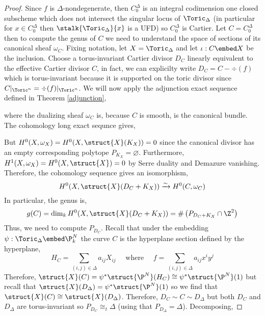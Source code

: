 \documentclass[12pt]{article}
\begin{document}
\begin{proof}
Since $f$ is $\Delta$-nondegenerate, then $C_0^\Delta$ is an integral codimension one closed subscheme which does not intersect the singular locus of $\Toric_\Delta$ (in particular for $x \in C_0^\Delta$ then $\stalk{\Toric_\Delta}{x}$ is a UFD) so $C_0^\Delta$ is Cartier. Let $C = C_0^\Delta$ then to compute the genus of $C$ we need to understand the space of sections of its canonical sheaf $\omega_C$. Fixing notation, let $X = \Toric_\Delta$ and let $\iota : C \embed X$ be the inclusion. Choose a torus-invariant Cartier divisor $D_C$ linearly equivalent to the effective Cartier divisor $C$, in fact, we can explicilty write $D_C = C - \div{(f)}$ which is torus-invariant because it is supported on the toric divisor since $C|_{\Toric^n} = \div{(f)}|_{\Toric^n}$. We will now apply the adjunction exact sequence defined in Theorem \ref{adjunction},
\begin{center}
\end{center}
where the dualizing sheaf $\omega_C$ is, because $C$ is smooth, is the canonical bundle. The cohomology long exact sequnce gives,
\begin{center}
\end{center} 
But $H^0(X, \omega_X) = H^0(X, \struct{X}(K_X)) = 0$ since the canonical divisor    has an empty corresponding polytope $P_{K_X} = \varnothing$. Furthermore, $H^1(X, \omega_X) = H^0(X, \struct{X}) = 0$ by Serre duality and Demazure vanishing. Therefore, the cohomology sequence gives an isomorphism,
\[ H^0(X, \struct{X}(D_C + K_X)) \xrightarrow{\sim} H^0(C, \omega_C) \]
In particular, the genus is,
\[ g(C) = \dim_k H^0(X, \struct{X}(D_C + K_X)) = \# \left( P_{D_C + K_X} \cap \Z^2 \right) \]
Thus, we need to compute $P_{D_C}$. Recall that under the embedding $\psi : \Toric_\Delta \embed \P^N_k$ the curve $C$ is the hyperplane section defined by the hyperplane,
\[ H_C = \sum_{(i, j) \in \Delta} a_{ij} X_{ij} \quad \text{ where } \quad f = \sum_{(i,j) \in \Delta} a_{ij} x^i y^j \]
Therefore, $\struct{X}(C) = \psi^* \struct{\P^N}(H_C) \cong \psi^* \struct{\P^N}(1)$ but recall that $\struct{X}(D_\Delta) = \psi^* \struct{\P^N}(1)$ so we find that $\struct{X}(C) \cong \struct{X}(D_\Delta)$. Therefore, $D_C \sim C \sim D_\Delta$ but both $D_C$ and $D_\Delta$ are torus-invariant so $P_{D_C} \cong_t \Delta$ (using that $P_{D_\Delta} = \Delta$). Decomposing,

\end{proof}
\end{document}
